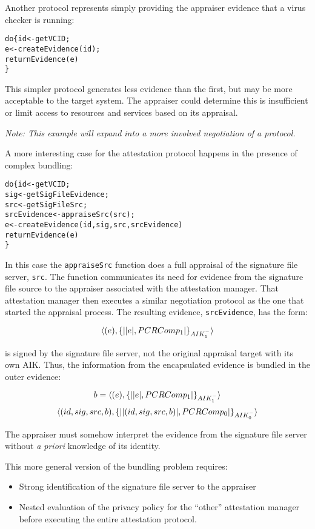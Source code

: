 \documentclass[10pt]{article}
\begin{document}
Another protocol represents simply providing the appraiser evidence
that a virus checker is running:

\begin{alltt}
  do \{ id <- getVCID;
       e <- createEvidence(id);
       returnEvidence(e)
  \}
\end{alltt}

This simpler protocol generates less evidence than the first, but may
be more acceptable to the target system.  The appraiser could
determine this is insufficient or limit access to resources and
services based on its appraisal.

\emph{Note: This example will expand into a more involved negotiation
  of a protocol.}

A more interesting case for the attestation protocol happens in the
presence of complex bundling:

\begin{alltt}
  do \{ id <- getVCID;
       sig <- getSigFileEvidence;
       src <- getSigFileSrc;
       srcEvidence <- appraiseSrc(src);
       e <- createEvidence(id,sig,src,srcEvidence)
       returnEvidence(e)
  \}
\end{alltt}

In this case the \Verb+appraiseSrc+ function does a full appraisal of
the signature file server, \Verb+src+. The function communicates its
need for evidence from the signature file source to the appraiser
associated with the attestation manager.  That attestation manager
then executes a similar negotiation protocol as the one that started
the appraisal process.  The resulting evidence, \Verb+srcEvidence+,
has the form:

\[\langle (e),\{\lvert \lvert e \rvert,PCRComp_1\rvert\}_{AIK_1^{-}}\rangle\]

is signed by the signature file server, not the original appraisal
target with its own AIK. Thus, the information from the encapsulated
evidence is bundled in the outer evidence:

\[b=\langle (e),\{\lvert \lvert e \rvert,PCRComp_1\rvert\}_{AIK_1^{-}}\rangle\]
\[\langle (id,sig,src,b),\{\lvert \lvert (id,sig,src,b) \rvert,PCRComp_0\rvert\}_{AIK_0^{-}}\rangle\]

The appraiser must somehow interpret the evidence from the signature
file server without \emph{a priori} knowledge of its identity.

This more general version of the bundling problem requires:

\begin{itemize}
  \parskip=0pt\itemsep=0pt
\item Strong identification of the signature file server to the appraiser
\item Nested evaluation of the privacy policy for the ``other''
  attestation manager before executing the entire attestation
  protocol.
\end{itemize}
\end{document}
